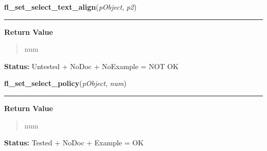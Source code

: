     \label{xformslib:library:fl_set_select_text_align}

    \vspace{0.5ex}

\hspace{.8\funcindent}\begin{boxedminipage}{\funcwidth}

    \raggedright \textbf{fl\_set\_select\_text\_align}(\textit{pObject}, \textit{p2})

    \vspace{-1.5ex}

    \rule{\textwidth}{0.5\fboxrule}
\setlength{\parskip}{2ex}
\setlength{\parskip}{1ex}
      \textbf{Return Value}
    \vspace{-1ex}

      \begin{quote}
      num

      \end{quote}

\textbf{Status:} Untested + NoDoc + NoExample = NOT OK



    \end{boxedminipage}

    \label{xformslib:library:fl_set_select_policy}

    \vspace{0.5ex}

\hspace{.8\funcindent}\begin{boxedminipage}{\funcwidth}

    \raggedright \textbf{fl\_set\_select\_policy}(\textit{pObject}, \textit{num})

    \vspace{-1.5ex}

    \rule{\textwidth}{0.5\fboxrule}
\setlength{\parskip}{2ex}
\setlength{\parskip}{1ex}
      \textbf{Return Value}
    \vspace{-1ex}

      \begin{quote}
      num

      \end{quote}

\textbf{Status:} Tested + NoDoc + Example = OK



    \end{boxedminipage}

